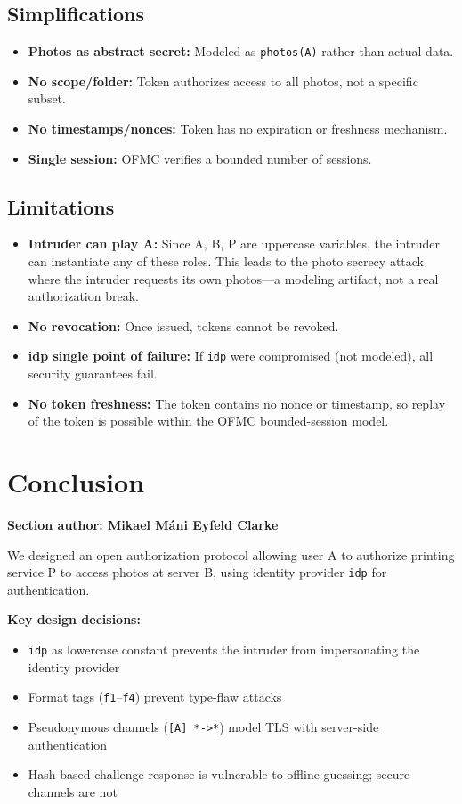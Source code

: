\documentclass[11pt,a4paper]{article}
\newcommand{\sectionauthor}[1]{\noindent\textbf{Section author: #1}\par\medskip}
\begin{document}
\subsection{Simplifications}
\begin{itemize}[leftmargin=*]
  \item \textbf{Photos as abstract secret:} Modeled as \texttt{photos(A)} rather than actual data.
  \item \textbf{No scope/folder:} Token authorizes access to all photos, not a specific subset.
  \item \textbf{No timestamps/nonces:} Token has no expiration or freshness mechanism.
  \item \textbf{Single session:} OFMC verifies a bounded number of sessions.
\end{itemize}

\subsection{Limitations}
\begin{itemize}[leftmargin=*]
  \item \textbf{Intruder can play A:} Since A, B, P are uppercase variables, the intruder can
        instantiate any of these roles. This leads to the photo secrecy attack where the
        intruder requests its own photos---a modeling artifact, not a real authorization break.
  \item \textbf{No revocation:} Once issued, tokens cannot be revoked.
  \item \textbf{idp single point of failure:} If \texttt{idp} were compromised (not modeled),
        all security guarantees fail.
  \item \textbf{No token freshness:} The token contains no nonce or timestamp, so replay
        of the token is possible within the OFMC bounded-session model.
\end{itemize}

\section{Conclusion}
\sectionauthor{Mikael Máni Eyfeld Clarke}

We designed an open authorization protocol allowing user A to authorize printing service P to access
photos at server B, using identity provider \texttt{idp} for authentication.

\textbf{Key design decisions:}
\begin{itemize}[leftmargin=*]
  \item \texttt{idp} as lowercase constant prevents the intruder from impersonating the identity provider
  \item Format tags (\texttt{f1}--\texttt{f4}) prevent type-flaw attacks
  \item Pseudonymous channels (\texttt{[A] *->*}) model TLS with server-side authentication
  \item Hash-based challenge-response is vulnerable to offline guessing; secure channels are not
\end{itemize}
\end{document}
